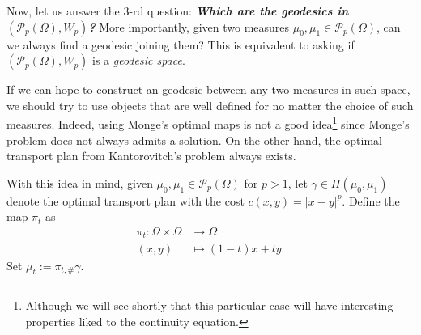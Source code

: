 Now, let us answer the 3-rd question: {\bf \em Which are the geodesics in $(\mathcal{P}_p(\Omega), W_p)$?} More importantly, given two measures $\mu_0, \mu_1 \in \mathcal{P}_p(\Omega)$, can we always find a geodesic joining them? This is equivalent to asking if $(\mathcal{P}_p(\Omega), W_p)$ is a {\em geodesic space}. 

If we can hope to construct an geodesic between any two measures in such space, we should try to use objects that are well defined for no matter the choice of such measures. Indeed, using Monge's optimal maps is not a good idea\footnote{ Although we will see shortly that this particular case will have interesting properties liked to the continuity equation.} since Monge's problem does not always admits a solution. On the other hand, the optimal transport plan from Kantorovitch's problem always exists. 

With this idea in mind, given $\mu_0, \mu_1 \in \mathcal{P}_p(\Omega)$ for $p > 1$, let $\gamma \in \Pi(\mu_0, \mu_1)$ denote the optimal transport plan with the cost $c(x,y) = |x-y|^p$. Define the map $\pi_t$ as 
\begin{equation*}
\begin{array}{rl}
\pi_t: \Omega\times \Omega &\to \Omega \\
(x,y)&\mapsto (1-t)x + ty.
\end{array}
\end{equation*}
Set $\mu_t := \pi_{t,\#}\gamma$. 

